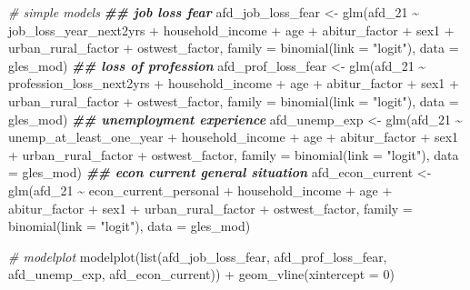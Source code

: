 \documentclass[
]{article}
\newenvironment{Shaded}{\begin{snugshade}}{\end{snugshade}}
\newcommand{\AttributeTok}[1]{\textcolor[rgb]{0.77,0.63,0.00}{#1}}
\newcommand{\CommentTok}[1]{\textcolor[rgb]{0.56,0.35,0.01}{\textit{#1}}}
\newcommand{\DecValTok}[1]{\textcolor[rgb]{0.00,0.00,0.81}{#1}}
\newcommand{\DocumentationTok}[1]{\textcolor[rgb]{0.56,0.35,0.01}{\textbf{\textit{#1}}}}
\newcommand{\FunctionTok}[1]{\textcolor[rgb]{0.00,0.00,0.00}{#1}}
\newcommand{\NormalTok}[1]{#1}
\newcommand{\OtherTok}[1]{\textcolor[rgb]{0.56,0.35,0.01}{#1}}
\newcommand{\SpecialCharTok}[1]{\textcolor[rgb]{0.00,0.00,0.00}{#1}}
\newcommand{\StringTok}[1]{\textcolor[rgb]{0.31,0.60,0.02}{#1}}
\begin{document}
\begin{Shaded}
\begin{Highlighting}[]
\CommentTok{\# simple models }
\DocumentationTok{\#\# job loss fear }
\NormalTok{afd\_job\_loss\_fear }\OtherTok{\textless{}{-}} \FunctionTok{glm}\NormalTok{(afd\_21 }\SpecialCharTok{\textasciitilde{}}\NormalTok{ job\_loss\_year\_next2yrs }\SpecialCharTok{+}\NormalTok{ household\_income }\SpecialCharTok{+}\NormalTok{ age }\SpecialCharTok{+}\NormalTok{ abitur\_factor }\SpecialCharTok{+}\NormalTok{ sex1 }\SpecialCharTok{+}\NormalTok{ urban\_rural\_factor }\SpecialCharTok{+}\NormalTok{ ostwest\_factor, }\AttributeTok{family =} \FunctionTok{binomial}\NormalTok{(}\AttributeTok{link =} \StringTok{"logit"}\NormalTok{), }
                         \AttributeTok{data =}\NormalTok{ gles\_mod)}
\DocumentationTok{\#\# loss of profession }
\NormalTok{afd\_prof\_loss\_fear }\OtherTok{\textless{}{-}} \FunctionTok{glm}\NormalTok{(afd\_21 }\SpecialCharTok{\textasciitilde{}}\NormalTok{ profession\_loss\_next2yrs }\SpecialCharTok{+}\NormalTok{ household\_income }\SpecialCharTok{+}\NormalTok{ age }\SpecialCharTok{+}\NormalTok{ abitur\_factor }\SpecialCharTok{+}\NormalTok{ sex1 }\SpecialCharTok{+}\NormalTok{ urban\_rural\_factor }\SpecialCharTok{+}\NormalTok{ ostwest\_factor, }\AttributeTok{family =} \FunctionTok{binomial}\NormalTok{(}\AttributeTok{link =} \StringTok{"logit"}\NormalTok{), }
                         \AttributeTok{data =}\NormalTok{ gles\_mod)}
\DocumentationTok{\#\# unemployment experience }
\NormalTok{afd\_unemp\_exp }\OtherTok{\textless{}{-}} \FunctionTok{glm}\NormalTok{(afd\_21 }\SpecialCharTok{\textasciitilde{}}\NormalTok{ unemp\_at\_least\_one\_year }\SpecialCharTok{+}\NormalTok{ household\_income }\SpecialCharTok{+}\NormalTok{ age }\SpecialCharTok{+}\NormalTok{ abitur\_factor }\SpecialCharTok{+}\NormalTok{ sex1 }\SpecialCharTok{+}\NormalTok{ urban\_rural\_factor }\SpecialCharTok{+}\NormalTok{ ostwest\_factor, }\AttributeTok{family =} \FunctionTok{binomial}\NormalTok{(}\AttributeTok{link =} \StringTok{"logit"}\NormalTok{), }
                         \AttributeTok{data =}\NormalTok{ gles\_mod)}
\DocumentationTok{\#\# econ current general situation }
\NormalTok{afd\_econ\_current }\OtherTok{\textless{}{-}} \FunctionTok{glm}\NormalTok{(afd\_21 }\SpecialCharTok{\textasciitilde{}}\NormalTok{ econ\_current\_personal }\SpecialCharTok{+}\NormalTok{ household\_income }\SpecialCharTok{+}\NormalTok{ age }\SpecialCharTok{+}\NormalTok{ abitur\_factor }\SpecialCharTok{+}\NormalTok{ sex1 }\SpecialCharTok{+}\NormalTok{ urban\_rural\_factor }\SpecialCharTok{+}\NormalTok{ ostwest\_factor, }\AttributeTok{family =} \FunctionTok{binomial}\NormalTok{(}\AttributeTok{link =} \StringTok{"logit"}\NormalTok{), }
                         \AttributeTok{data =}\NormalTok{ gles\_mod)}

\CommentTok{\# modelplot }
\FunctionTok{modelplot}\NormalTok{(}\FunctionTok{list}\NormalTok{(afd\_job\_loss\_fear, afd\_prof\_loss\_fear, }
\NormalTok{               afd\_unemp\_exp, afd\_econ\_current)) }\SpecialCharTok{+}
  \FunctionTok{geom\_vline}\NormalTok{(}\AttributeTok{xintercept =} \DecValTok{0}\NormalTok{)}
\end{Highlighting}
\end{Shaded}
\end{document}
